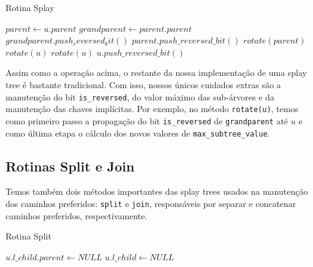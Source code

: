 \begin{algorithm}[h!]
    \caption{Rotina Splay}\label{splay:splay}
    \begin{algorithmic}
         
        \State $parent \gets u.parent$
        \State $grandparent \gets parent.parent$
        \State $grandparent.push_reversed_bit()$
        \State $parent.push\_reversed\_bit()$
        \State $rotate(parent)$
        \Else
        \State $rotate(u)$
        \EndIf
        \EndIf
        \State $rotate(u)$
        \EndWhile
        \State $u.push\_reversed\_bit()$
        \EndFunction
    \end{algorithmic}
\end{algorithm}

Assim como a operação acima, o restante da nossa implementação de uma splay tree é bastante tradicional. Com isso, nossos únicos cuidados extras são a manutenção do bit \texttt{is\_reversed}, do valor máximo das sub-árvores e da manutenção das chaves implícitas. Por exemplo, no método \texttt{rotate(u)}, temos como primeiro passo a propagação do bit \texttt{is\_reversed} de \texttt{grandparent} até $u$ e como última etapa o cálculo dos novos valores de \texttt{max\_subtree\_value}.

\subsection{Rotinas Split e Join}
\label{subsection:lct-splay-split-join}

Temos também dois métodos importantes das splay trees usados na manutenção dos caminhos preferidos: \texttt{split} e \texttt{join}, responsáveis por separar e concatenar caminhos preferidos, respectivamente.

\begin{algorithm}[h!]
    \caption{Rotina Split}\label{splay:split}
    \begin{algorithmic}
        \State $u.l\_child.parent \gets NULL$
        \EndIf
        \State $u.l\_child \gets NULL$
        \EndFunction
    \end{algorithmic}
\end{algorithm}

